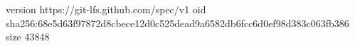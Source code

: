 version https://git-lfs.github.com/spec/v1
oid sha256:68e5d63f97872d8cbece12d0c525dead9a6582db6fcc6d0ef98d383c063fb386
size 43848

